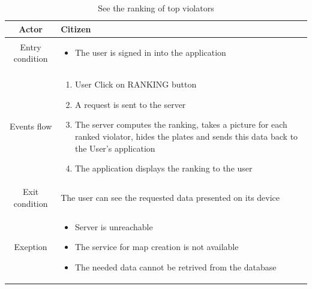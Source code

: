 \documentclass{article}
\begin{document}
		\begin{table} [H]
		\begin{center}
		\caption{See the ranking of top violators}
		\begin{tabular}{|c|p{8cm}|}
			\hline
			Actor			&	Citizen\\
			\hline
			Entry condition	&	\begin{itemize}[noitemsep,topsep=0pt]
								\item The user is signed in into the application
								\end{itemize}\\
			\hline
			 Events flow		&	\begin{enumerate}[noitemsep,topsep=0pt]
									\item User Click on RANKING button			
									\item A request is sent to the server
									\item The server computes the ranking, takes a picture for
									each ranked violator, hides the plates and sends this data 
									back to the User's application
									\item The application displays the ranking to the user
								\end{enumerate}\\
			\hline
			Exit condition 	&	The user can see the requested data presented on its device\\
			\hline
			Exeption			&	\begin{itemize}[noitemsep,topsep=0pt]
									\item Server is unreachable
									\item The service for map creation is not available
									\item The needed data cannot be retrived from the database
								\end{itemize}\\
			\hline
		\end{tabular}
		\end{center}
		\end{table} 
		
\end{document}
